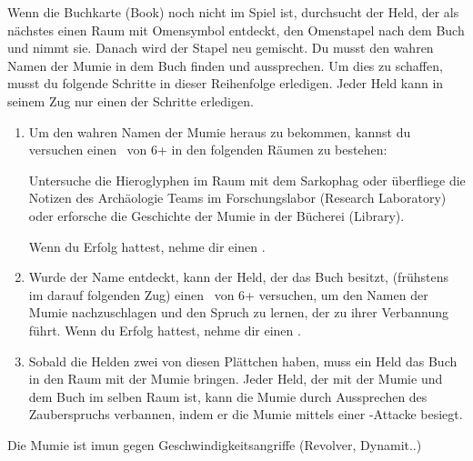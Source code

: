   \begin{itemize}
        \bitem Wenn die Buchkarte (Book) noch nicht im Spiel ist, durchsucht der Held, der als nächstes einen Raum mit Omensymbol entdeckt, den Omenstapel nach dem Buch und nimmt sie. Danach wird der Stapel neu gemischt.
        \bitem Du musst den wahren Namen der Mumie in dem Buch finden und aussprechen. Um dies zu schaffen, musst du folgende Schritte in dieser Reihenfolge erledigen. Jeder Held kann in seinem Zug nur einen der Schritte erledigen.

\newpage
        \begin{enumerate}
            \item Um den wahren Namen der Mumie heraus zu bekommen, kannst du versuchen einen \knowroll\ von 6+ in den folgenden Räumen zu bestehen:

            \begin{itemize}
                \bitem Untersuche die Hieroglyphen im Raum mit dem Sarkophag oder
                \bitem überfliege die Notizen des Archäologie Teams im Forschungslabor (Research Laboratory) oder
                \bitem erforsche die Geschichte der Mumie in der Bücherei (Library).
            \end{itemize}
            Wenn du Erfolg hattest, nehme dir einen .

            \item Wurde der Name entdeckt, kann der Held, der das Buch besitzt, (frühstens im darauf folgenden Zug) einen \knowroll\ von 6+ versuchen, um den Namen der Mumie nachzuschlagen und den Spruch zu lernen, der zu ihrer Verbannung führt. Wenn du Erfolg hattest, nehme dir einen .


            \item Sobald die Helden zwei von diesen Plättchen haben, muss ein Held das Buch in den Raum mit der Mumie bringen. Jeder Held, der mit der Mumie und dem Buch im selben Raum ist, kann die Mumie durch Aussprechen des Zauberspruchs verbannen, indem er  die Mumie mittels einer \sanity-Attacke besiegt.
        \end{enumerate}

    \bitem Die Mumie ist imun gegen Geschwindigkeitsangriffe (Revolver, Dynamit..)

    \end{itemize}


